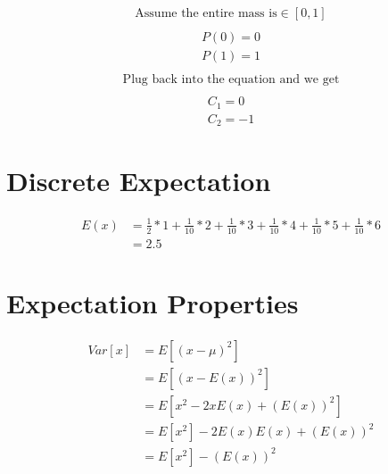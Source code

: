 \documentclass[paper=a4, fontsize=11pt]{scrartcl} %
\begin{document}
\begin{align*}
\text{Assume the entire mass is} \in [0, 1] \\
\end{align*}
\begin{align*}
P(0) = 0 \\
P(1) = 1 \\
\end{align*}
\begin{align*}
\text{Plug back into the equation and we get} \\
\end{align*}
\begin{align*}
C_1 = 0 \\
C_2 = -1
\end{align*}



\section{Discrete Expectation}

    \[
        \begin{split}
            E(x)  &= \frac{1}{2}*1 + \frac{1}{10}*2 + \frac{1}{10}*3 + \frac{1}{10}*4 + \frac{1}{10}*5 + \frac{1}{10}*6
            \\
            &= 2.5
        \end{split}
    \]


\section{Expectation Properties}
    \[
        \begin{split}
            Var[x]  &= E[(x-\mu)^2]
\\&= E[(x-E(x))^2]
\\&= E[x^2 - 2xE(x)+ (E(x))^2]
\\&= E[x^2] - 2E(x)E(x)+ (E(x))^2
\\&= E[x^2] - (E(x))^2
        \end{split}
    \]

\end{document}
